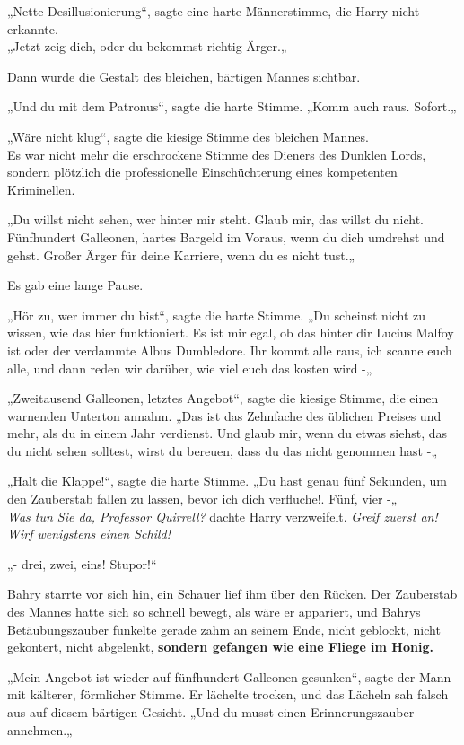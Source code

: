 {„Nette Desillusionierung“, sagte eine harte Männerstimme, die Harry nicht erkannte.\\ „Jetzt zeig dich, oder du bekommst richtig Ärger.„

Dann wurde die Gestalt des bleichen, bärtigen Mannes sichtbar.

„Und du mit dem Patronus“, sagte die harte Stimme. „Komm auch raus. Sofort.„

„Wäre nicht klug“, sagte die kiesige Stimme des bleichen Mannes.\\ Es war nicht mehr die erschrockene Stimme des Dieners des Dunklen Lords, sondern plötzlich die professionelle Einschüchterung eines kompetenten Kriminellen.

„Du willst nicht sehen, wer hinter mir steht. Glaub mir, das willst du nicht. Fünfhundert Galleonen, hartes Bargeld im Voraus, wenn du dich umdrehst und gehst. Großer Ärger für deine Karriere, wenn du es nicht tust.„

Es gab eine lange Pause.

„Hör zu, wer immer du bist“, sagte die harte Stimme. „Du scheinst nicht zu wissen, wie das hier funktioniert. Es ist mir egal, ob das hinter dir Lucius Malfoy ist oder der verdammte Albus Dumbledore. Ihr kommt alle raus, ich scanne euch alle, und dann reden wir darüber, wie viel euch das kosten wird -„

„Zweitausend Galleonen, letztes Angebot“, sagte die kiesige Stimme, die einen warnenden Unterton annahm. „Das ist das Zehnfache des üblichen Preises und mehr, als du in einem Jahr verdienst. Und glaub mir, wenn du etwas siehst, das du nicht sehen solltest, wirst du bereuen, dass du das nicht genommen hast -„

„Halt die Klappe!“, sagte die harte Stimme. „Du hast genau fünf Sekunden, um den Zauberstab fallen zu lassen, bevor ich dich verfluche!. Fünf, vier -„\\ \emph{\hfill\break Was tun Sie da, Professor Quirrell?} dachte Harry verzweifelt. \emph{Greif zuerst an! Wirf wenigstens einen Schild!}

„- drei, zwei, eins! Stupor!“

Bahry starrte vor sich hin, ein Schauer lief ihm über den Rücken. Der Zauberstab des Mannes hatte sich so schnell bewegt, als wäre er appariert, und Bahrys Betäubungszauber funkelte gerade zahm an seinem Ende, nicht geblockt, nicht gekontert, nicht abgelenkt, \textbf{sondern gefangen wie eine Fliege im Honig.}

„Mein Angebot ist wieder auf fünfhundert Galleonen gesunken“, sagte der Mann mit kälterer, förmlicher Stimme. Er lächelte trocken, und das Lächeln sah falsch aus auf diesem bärtigen Gesicht. „Und du musst einen Erinnerungszauber annehmen.„

}
